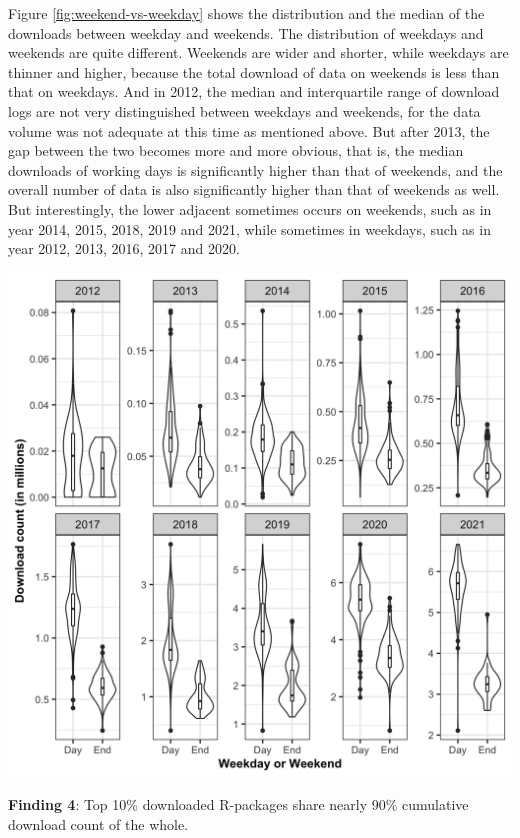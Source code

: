 \documentclass[
]{book}
\newenvironment{discovery}[1]{%
  \begin{tcolorbox}[colback=blue!30,colframe=blue!80!black]#1}{\end{tcolorbox}}
\begin{document}
Figure \ref{fig:weekend-vs-weekday} shows the distribution and the median of the downloads between weekday and weekends. The distribution of weekdays and weekends are quite different. Weekends are wider and shorter, while weekdays are thinner and higher, because the total download of data on weekends is less than that on weekdays. And in 2012, the median and interquartile range of download logs are not very distinguished between weekdays and weekends, for the data volume was not adequate at this time as mentioned above. But after 2013, the gap between the two becomes more and more obvious, that is, the median downloads of working days is significantly higher than that of weekends, and the overall number of data is also significantly higher than that of weekends as well. But interestingly, the lower adjacent sometimes occurs on weekends, such as in year 2014, 2015, 2018, 2019 and 2021, while sometimes in weekdays, such as in year 2012, 2013, 2016, 2017 and 2020.

\begin{center}\includegraphics{figures/weekend-vs-weekday-1} \end{center}

\begin{discovery}
\textbf{Finding 4}: Top 10\% downloaded R-packages share nearly 90\%
cumulative download count of the whole.
\end{discovery}
\end{document}
